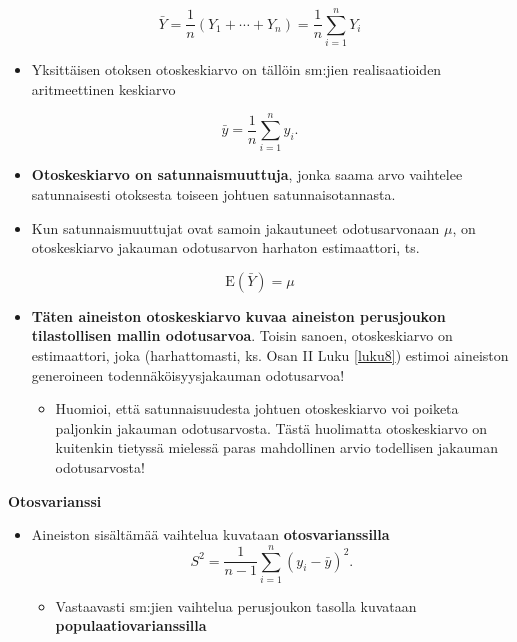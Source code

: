 \documentclass[
]{book}
\providecommand{\tightlist}{%
  \setlength{\itemsep}{0pt}\setlength{\parskip}{0pt}}
\begin{document}
\[
\bar{Y} = \frac{1}{n}(Y_1 + \cdots + Y_n) = \frac{1}{n} \sum_{i=1}^{n} Y_i
\]

\begin{itemize}
\tightlist
\item
  Yksittäisen otoksen otoskeskiarvo on tällöin sm:jien realisaatioiden aritmeettinen keskiarvo
\end{itemize}

\[
\bar{y} = \frac{1}{n} \sum_{i=1}^{n} y_i.
\]

\begin{itemize}
\tightlist
\item
  \textbf{Otoskeskiarvo on satunnaismuuttuja}, jonka saama arvo vaihtelee satunnaisesti otoksesta toiseen johtuen satunnaisotannasta.
\item
  Kun satunnaismuuttujat ovat samoin jakautuneet odotusarvonaan \(\mu\), on otoskeskiarvo jakauman odotusarvon harhaton estimaattori, ts.
\end{itemize}

\[\text{E}(\bar{Y}) = \mu\]

\begin{itemize}
\tightlist
\item
  \textbf{Täten aineiston otoskeskiarvo kuvaa aineiston perusjoukon tilastollisen mallin odotusarvoa}. Toisin sanoen, otoskeskiarvo on estimaattori, joka (harhattomasti, ks. Osan II Luku \ref{luku8}) estimoi aineiston generoineen todennäköisyysjakauman odotusarvoa!

  \begin{itemize}
  \tightlist
  \item
    Huomioi, että satunnaisuudesta johtuen otoskeskiarvo voi poiketa paljonkin jakauman odotusarvosta. Tästä huolimatta otoskeskiarvo on kuitenkin tietyssä mielessä paras mahdollinen arvio todellisen jakauman odotusarvosta!
  \end{itemize}
\end{itemize}

\textbf{Otosvarianssi}

\begin{itemize}
\item
  Aineiston sisältämää vaihtelua kuvataan \textbf{otosvarianssilla}
  \[
  S^2= \frac{1}{n-1} \sum_{i=1}^{n} (y_i - \bar{y})^2.
  \]

  \begin{itemize}
  \tightlist
  \item
    Vastaavasti sm:jien vaihtelua perusjoukon tasolla kuvataan \textbf{populaatiovarianssilla}
  \end{itemize}
\end{itemize}
\end{document}
